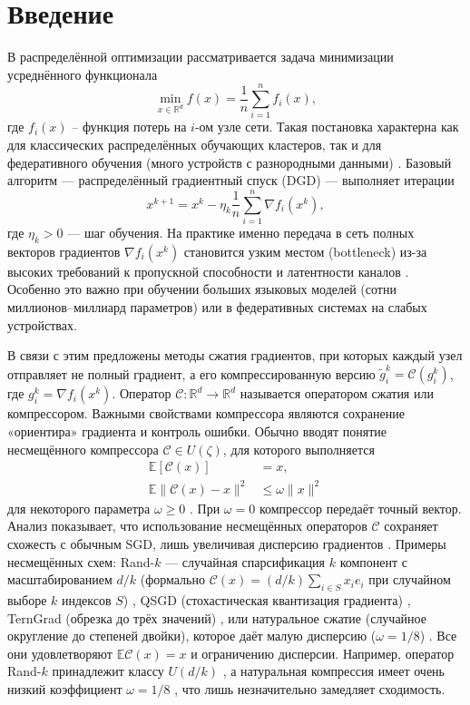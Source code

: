 \section{Введение}
В распределённой оптимизации рассматривается задача минимизации усреднённого функционала
\begin{equation}
\min_{x\in\mathbb{R}^d} f(x) = \frac{1}{n}\sum_{i=1}^n f_i(x),
\end{equation}
где $f_i(x)$ – функция потерь на $i$-ом узле сети. Такая постановка характерна как для классических распределённых обучающих кластеров, так и для федеративного обучения (много устройств с разнородными данными) \cite{Beznosikov2023}. Базовый алгоритм — распределённый градиентный спуск (DGD) — выполняет итерации
\begin{equation}
\label{eq:dgd}
x^{k+1} = x^k - \eta_k \frac{1}{n}\sum_{i=1}^n \nabla f_i(x^k),
\end{equation}
где $\eta_k>0$ — шаг обучения. На практике именно передача в сеть полных векторов градиентов $\nabla f_i(x^k)$ становится узким местом (bottleneck) из-за высоких требований к пропускной способности и латентности каналов \cite{Beznosikov2023}. Особенно это важно при обучении больших языковых моделей (сотни миллионов–миллиард параметров) или в федеративных системах на слабых устройствах. 

В связи с этим предложены методы сжатия градиентов, при которых каждый узел отправляет не полный градиент, а его компрессированную версию $\widetilde{g}_i^k = \mathcal{C}(g_i^k)$, где $g_i^k=\nabla f_i(x^k)$. Оператор $\mathcal{C}:\mathbb{R}^d\to\mathbb{R}^d$ называется оператором сжатия или компрессором. Важными свойствами компрессора являются сохранение «ориентира» градиента и контроль ошибки. Обычно вводят понятие несмещённого компрессора $ \mathcal{C}\in U(\zeta)$, для которого выполняется
\begin{align}
\mathbb{E}[\mathcal{C}(x)] &= x,\\
\mathbb{E}\|\mathcal{C}(x)-x\|^2 &\le \omega \|x\|^2
\end{align}
для некоторого параметра $\omega\ge0$ \cite{Horvath2022}. При $\omega=0$ компрессор передаёт точный вектор. Анализ показывает, что использование несмещённых операторов $\mathcal{C}$ сохраняет схожесть с обычным SGD, лишь увеличивая дисперсию градиентов \cite{Horvath2022,Mishchenko2019}. Примеры несмещённых схем: Rand-\(k\) — случайная спарсификация \(k\) компонент с масштабированием \(d/k\) (формально \(\mathcal{C}(x) = (d/k)\sum_{i\in S} x_i e_i\) при случайном выборе \(k\) индексов \(S\)) \cite{Beznosikov2023}, QSGD (стохастическая квантизация градиента) \cite{Alistarh2017}, TernGrad (обрезка до трёх значений) \cite{Wen2017}, или натуральное сжатие (случайное округление до степеней двойки), которое даёт малую дисперсию (\(\omega=1/8\)) \cite{Horvath2022}. Все они удовлетворяют \(\mathbb{E}\mathcal{C}(x)=x\) и ограничению дисперсии. Например, оператор Rand-\(k\) принадлежит классу \(U(d/k)\) \cite{Beznosikov2023}, а натуральная компрессия имеет очень низкий коэффициент \(\omega=1/8\) \cite{Horvath2022}, что лишь незначительно замедляет сходимость.

